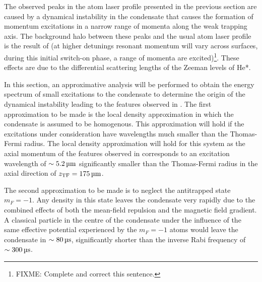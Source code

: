 The observed peaks in the atom laser profile presented in the previous section are caused by a dynamical instability in the condensate that causes the formation of momentum excitations in a narrow range of momenta along the weak trapping axis. The background halo between these peaks and the usual atom laser profile is the result of (at higher detunings resonant momentum will vary across surfaces, during this initial switch-on phase, a range of momenta are excited)\footnote{FIXME: Complete and correct this sentence.}. These effects are due to the differential scattering lengths of the Zeeman levels of He*.

In this section, an approximative analysis will be performed to obtain the energy spectrum of small excitations to the condensate to determine the origin of the dynamical instability leading to the features observed in . The first approximation to be made is the local density approximation \cite{Stamper-Kurn:1999,Zambelli:2000} in which the condensate is assumed to be homogenous. This approximation will hold if the excitations under consideration have wavelengths much smaller than the Thomas-Fermi radius. The local density approximation will hold for this system as the axial momentum of the features observed in  corresponds to an excitation wavelength of $\sim \unit[5.2]{\micro m}$ significantly smaller than the Thomas-Fermi radius in the axial direction of $z_\text{TF} = \unit[175]{\micro m}$.

The second approximation to be made is to neglect the antitrapped state $m_F=-1$. Any density in this state leaves the condensate very rapidly due to the combined effects of both the mean-field repulsion and the magnetic field gradient. A classical particle in the centre of the condensate under the influence of the same effective potential experienced by the $m_F=-1$ atoms would leave the condensate in $\sim \unit[80]{\micro s}$, significantly shorter than the inverse Rabi frequency of $\sim \unit[300]{\micro s}$.

